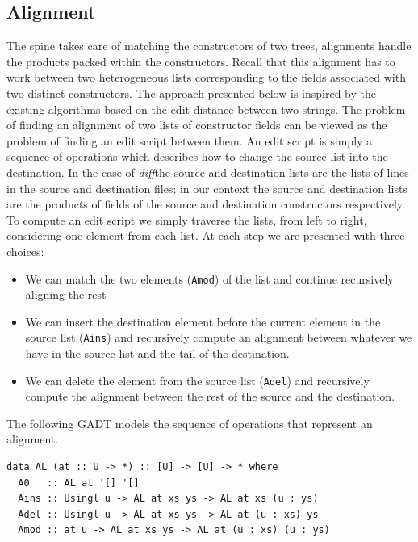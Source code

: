 \documentclass[11pt, titlepage]{article}
\newcommand{\toHaskell}[1]{\texttt{#1}\xspace}
\newcommand{\diff}{\emph{diff}}
\newcommand{\ains}{\toHaskell{Ains}}
\newcommand{\adel}{\toHaskell{Adel}}
\newcommand{\amod}{\toHaskell{Amod}}
\begin{document}
\subsection{Alignment}\label{alignment}

The spine takes care of matching the constructors of two trees, alignments handle the products packed within the constructors.
Recall that this alignment has to work between two heterogeneous lists corresponding to the fields associated with two distinct constructors.
The approach presented below is inspired by the existing algorithms based on the edit distance between two strings. 
The problem of finding an alignment of two lists of constructor fields can be viewed as the problem of finding an edit script between them. An edit script is simply a sequence of operations which describes how to change the source list into the destination. In the case of \diff the source and destination lists are the lists of lines in the source and destination files; in our context the source and destination lists are the products of fields of the source and destination constructors respectively. 
To compute an edit script we simply traverse the lists, from left to right, considering one element from each list. At each step we are presented with three choices:

\begin{itemize}
\item
  We can match the two elements (\amod) of the list and continue
  recursively aligning the rest
\item
  We can insert the destination element before the current element in
  the source list (\ains) and recursively compute an alignment between
  whatever we have in the source list and the tail of the destination.
\item
  We can delete the element from the source list (\adel) and recursively
  compute the alignment between the rest of the source and the
  destination.
\end{itemize}

The following GADT models the sequence of operations that represent an 
alignment.

\begin{verbatim}
data AL (at :: U -> *) :: [U] -> [U] -> * where
  A0   :: AL at '[] '[]
  Ains :: Usingl u -> AL at xs ys -> AL at xs (u : ys)
  Adel :: Usingl u -> AL at xs ys -> AL at (u : xs) ys
  Amod :: at u -> AL at xs ys -> AL at (u : xs) (u : ys)
\end{verbatim}
\end{document}
